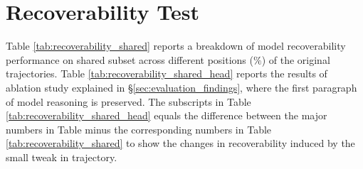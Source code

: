 \documentclass{article} %
\begin{document}
\newpage



\section{Recoverability Test}
Table \ref{tab:recoverability_shared} reports a breakdown of model recoverability performance on shared subset across different positions ($\%$) of the original trajectories. Table \ref{tab:recoverability_shared_head} reports the results of ablation study explained in \S \ref{sec:evaluation_findings}, where the first paragraph of model reasoning is preserved. The subscripts in Table \ref{tab:recoverability_shared_head} equals the difference between the major numbers in Table minus the corresponding numbers in Table \ref{tab:recoverability_shared} to show the changes in recoverability induced by the small tweak in trajectory.
\end{document}
